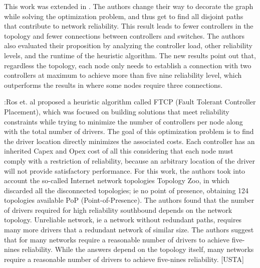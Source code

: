 \documentclass[a4paper,10pt]{article}
\begin{document}

This work was extended in \cite{RoRu16}. The authors change their way to decorate the graph while solving the optimization problem, and thus get to find all disjoint paths that contribute to network reliability. This result leads to fewer controllers in the topology and fewer connections between controllers and switches. The authors also evaluated their proposition by analyzing the controller load, other reliability levels, and the runtime of the heuristic algorithm. The new results point out that, regardless the topology, each node only needs to establish a connection with two controllers at maximum to achieve more than five nine reliability level, which outperforms the results in \cite{RoRu14} where some nodes require three connections. 


\cite{RoRu14}:Ros et. al proposed a heuristic algorithm called FTCP (Fault Tolerant Controller Placement), which was focused on building solutions that meet reliability constraints while trying to minimize the number of controllers per node along with the total number of drivers. The goal of this optimization problem is to find the driver location directly minimizes the associated costs. Each controller has an inherited Capex and Opex cost of all this considering that each node must comply with a restriction of reliability, because an arbitrary location of the driver will not provide satisfactory performance. For this work, the authors took into account the so-called Internet network topologies Topology Zoo, in which discarded all the disconnected topologies; ie no point of presence, obtaining 124 topologies available PoP (Point-of-Presence). The authors found that the number of drivers required for high reliability southbound depends on the network topology. Unreliable network, ie a network without redundant paths, requires many more drivers that a redundant network of similar size. The authors suggest that for many networks require a reasonable number of drivers to achieve five-nines reliability. While the answers depend on the topology itself, many networks require a reasonable number of drivers to achieve five-nines reliability. [USTA]
\end{document}
